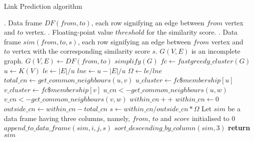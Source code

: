 \documentclass[a4paper]{article}
\begin{document}
\begin{algorithm}
\caption{Link Prediction algorithm}\label{algo:lp}

\begin{algorithmic}[1]
\INPUT
    . Data frame $DF(from, to)$, each row signifying an edge between $from$ vertex and $to$ vertex.
    . Floating-point value  $threshold$ for the similarity score.
\OUTPUT
    . Data frame $sim(from, to, s)$, each row signifying an edge between $from$ vertex and $to$ vertex 
     with the corresponding similarity score $s$.
\Ensure
    \Statex $G(V, E)$ is an incomplete graph.
\Statex
{}
    \State $G(V, E)\gets DF(from, to)$ 
    \State $simplify(G)$ 
    \State $fc \gets fastgreedy\_cluster(G)$ 
    \State $u \gets K(V)$ 
    \State $le \gets |E| / u$
    \State $lne \gets u - |E| / u$
    \State $\Omega \gets le / lne$
            \State $total\_cn \gets get\_common\_neighbours(u, v)$
            \State $u\_cluster \gets fc\$membership[u]$  
            \State $v\_cluster \gets fc\$membership[v]$ 
                    \State $u\_cn <- get\_common\_neighbours(u, w)$
                    \State $v\_cn <- get\_common\_neighbours(v, w)$
                            \State $within\_cn++$
                        \EndIf \label{lp_memlmemiendif}
                    \EndIf \label{lp_commonendif}
                \EndFor \label{lp_wendfor}
            \Else
                \State $within\_cn \gets 0$
            \EndIf \label{lp_memendif}
            \State $outside\_cn \gets within\_cn - total\_cn$
                \State $s \gets within\_cn / outside\_cn * \Omega$
            \EndIf \label{lp_withinendif}
            \State Let $sim$ be a data frame having three columns, namely, $from$, $to$ and $score$ initialised to $0$
                \State $append\_to\_data\_frame(sim, i, j, s)$  
            \EndIf \label{lp_sendif}
        \EndIf \label{lp_uvendif}
    \EndFor \label{lp_uvendfor}
    \State $sort\_descending\_by\_column(sim, 3)$
    \State \textbf{return} $sim$
\EndProcedure
{}
\end{algorithmic}
\end{algorithm}
\end{document}
